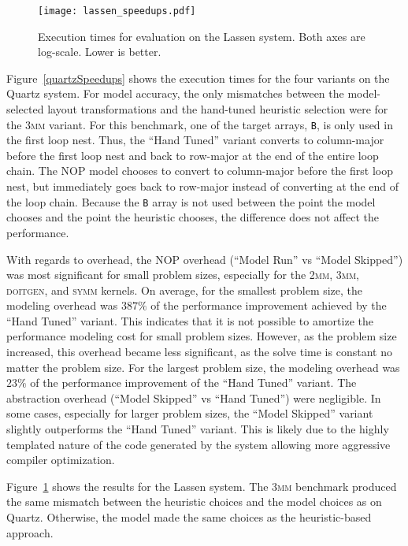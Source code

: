 \begin{figure}
\texttt{[image: lassen\_speedups.pdf]}
\caption{Execution times for evaluation on the Lassen system. Both axes are log-scale. Lower is better.}
\label{lassenSpeedups}
\end{figure}

Figure~\ref{quartzSpeedups} shows the execution times for the four variants on the Quartz system. 
For model accuracy, the only mismatches between the model-selected layout transformations and the hand-tuned heuristic selection were for the \textsc{3mm} variant.
For this benchmark, one of the target arrays, \verb.B., is only used in the first loop nest. 
Thus, the ``Hand Tuned'' variant converts to column-major before the first loop nest and back to row-major at the end of the entire loop chain.
The NOP model chooses to convert to column-major before the first loop nest, but immediately goes back to row-major instead of converting at the end of the loop chain.
Because the \verb.B. array is not used between the point the model chooses and the point the heuristic chooses, the difference does not affect the performance.

With regards to overhead, the NOP overhead (``Model Run'' vs ``Model Skipped'') was most significant for small problem sizes, especially for the \textsc{2mm}, \textsc{3mm}, \textsc{doitgen}, and \textsc{symm} kernels.
On average, for the smallest problem size, the modeling overhead was $387\%$ of the performance improvement achieved by the ``Hand Tuned'' variant.
This indicates that it is not possible to amortize the performance modeling cost for small problem sizes.
However, as the problem size increased, this overhead became less significant, as the solve time is constant no matter the problem size.
For the largest problem size, the modeling overhead was $23\%$ of the performance improvement of the ``Hand Tuned'' variant. 
The abstraction overhead (``Model Skipped'' vs ``Hand Tuned'') were negligible.
In some cases, especially for larger problem sizes, the ``Model Skipped'' variant slightly outperforms the ``Hand Tuned'' variant.
This is likely due to the highly templated nature of the code generated by the \FormatDecisions{} system allowing more aggressive compiler optimization.

Figure~\ref{lassenSpeedups} shows the results for the Lassen system.
The \textsc{3mm} benchmark produced the same mismatch between the heuristic choices and the model choices as on Quartz.
Otherwise, the model made the same choices as the heuristic-based approach.

